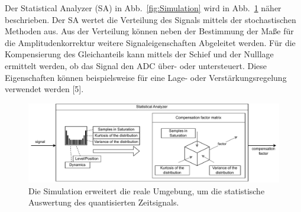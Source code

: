 Der Statistical Analyzer (SA) in Abb.~\ref{fig:Simulation} wird in Abb.~\ref{fig:sa} näher beschrieben. Der SA wertet die Verteilung des Signals mittels der stochastischen Methoden aus. Aus der Verteilung können neben der Bestimmung der Maße für die Amplitudenkorrektur weitere Signaleigenschaften Abgeleitet werden. Für die Kompensierung des Gleichanteils kann mittels der Schief und der Nulllage ermittelt werden, ob das Signal den ADC über- oder  untersteuert. Diese Eigenschaften können beispielsweise für eine Lage- oder Verstärkungsregelung verwendet werden [5].

\begin{figure}[h!] 
	\centering 
		\includegraphics[width=1\columnwidth]{../img/stat_analyser.pdf}
	\caption{Die Simulation erweitert die reale Umgebung, um die statistische Auswertung des quantisierten Zeitsignals.}
	\label{fig:sa}
\end{figure} 

